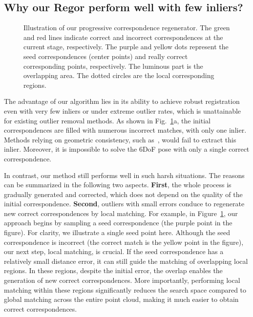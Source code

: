 \subsection{Why our Regor perform well with few inliers?}
\begin{figure}[ht]
    \caption{
        Illustration of our progressive correspondence regenerator.
        The green and red lines indicate correct and incorrect correspondences at the current stage, respectively. The purple and yellow dots represent the seed correspondences (center points) and really correct corresponding points, respectively.
        The luminous part is the overlapping area. 
        The dotted circles are the local corresponding regions.
       }
    \label{analysis}
\end{figure}

The advantage of our algorithm lies in its ability to achieve robust registration even with very few inliers or under extreme outlier rates, which is unattainable for existing outlier removal methods.
As shown in Fig.~\ref{analysis}a, the initial correspondences are filled with numerous incorrect matches, with only one inlier. Methods relying on geometric consistency, such as~\cite{chen2022sc2,zhang20233d}, would fail to extract this inlier.  Moreover, it is impossible to solve the 6DoF pose with only a single correct correspondence.%

In contrast, our method still performs well in such harsh situations. The reasons can be summarized in the following two aspects. \textbf{First}, the whole process is gradually generated and corrected, which does not depend on the quality of the initial correspondence. \textbf{Second}, outliers with small errors conduce to regenerate new correct correspondences by local matching. %
For example, in Figure~\ref{analysis}, our approach begins by sampling a seed correspondence (the purple point in the figure).  For clarity, we illustrate a single seed point here.  Although the seed correspondence is incorrect (the correct match is the yellow point in the figure), our next step, local matching, is crucial.
If the seed correspondence has a relatively small distance error, it can still guide the matching of overlapping local regions.  In these regions, despite the initial error, the overlap enables the generation of new correct correspondences.  More importantly, performing local matching within these regions significantly reduces the search space compared to global matching across the entire point cloud, making it much easier to obtain correct correspondences.

